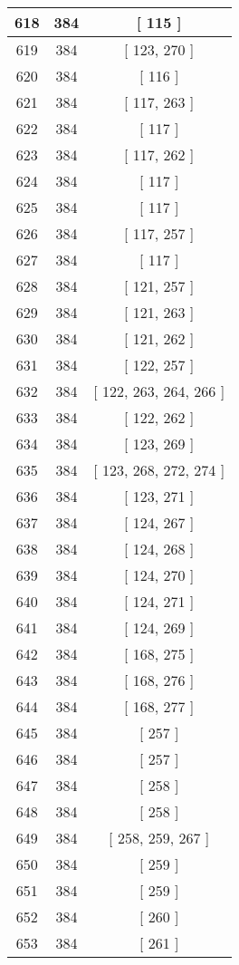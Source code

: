 \begin{center}
\begin{longtable}[H]{|| c c c ||}
618 & 384 & [ 115 ]
\\\hline
619 & 384 & [ 123, 270 ]
\\\hline
620 & 384 & [ 116 ]
\\\hline
621 & 384 & [ 117, 263 ]
\\\hline
622 & 384 & [ 117 ]
\\\hline
623 & 384 & [ 117, 262 ]
\\\hline
624 & 384 & [ 117 ]
\\\hline
625 & 384 & [ 117 ]
\\\hline
626 & 384 & [ 117, 257 ]
\\\hline
627 & 384 & [ 117 ]
\\\hline
628 & 384 & [ 121, 257 ]
\\\hline
629 & 384 & [ 121, 263 ]
\\\hline
630 & 384 & [ 121, 262 ]
\\\hline
631 & 384 & [ 122, 257 ]
\\\hline
632 & 384 & [ 122, 263, 264, 266 ]
\\\hline
633 & 384 & [ 122, 262 ]
\\\hline
634 & 384 & [ 123, 269 ]
\\\hline
635 & 384 & [ 123, 268, 272, 274 ]
\\\hline
636 & 384 & [ 123, 271 ]
\\\hline
637 & 384 & [ 124, 267 ]
\\\hline
638 & 384 & [ 124, 268 ]
\\\hline
639 & 384 & [ 124, 270 ]
\\\hline
640 & 384 & [ 124, 271 ]
\\\hline
641 & 384 & [ 124, 269 ]
\\\hline
642 & 384 & [ 168, 275 ]
\\\hline
643 & 384 & [ 168, 276 ]
\\\hline
644 & 384 & [ 168, 277 ]
\\\hline
645 & 384 & [ 257 ]
\\\hline
646 & 384 & [ 257 ]
\\\hline
647 & 384 & [ 258 ]
\\\hline
648 & 384 & [ 258 ]
\\\hline
649 & 384 & [ 258, 259, 267 ]
\\\hline
650 & 384 & [ 259 ]
\\\hline
651 & 384 & [ 259 ]
\\\hline
652 & 384 & [ 260 ]
\\\hline
653 & 384 & [ 261 ]
\\\hline

\end{longtable}
\end{center}
